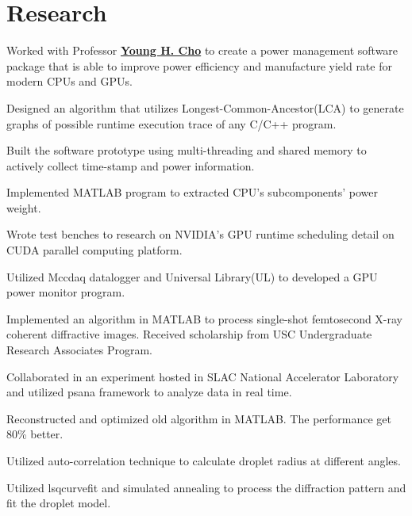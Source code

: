 \documentclass[]{deedy-resume-openfont}
\begin{document}
\begin{minipage}[t]{0.69\textwidth}

\section{Research}
Worked with Professor \textbf{\href{http://oasys.isi.edu/profile.php?id=1}{Young H. Cho}} to create a power management software package that is able to improve power efficiency and manufacture yield rate for modern CPUs and GPUs.
\begin{tightemize}
	\item Designed an algorithm that utilizes Longest-Common-Ancestor(LCA) to generate graphs of possible runtime execution trace of any C/C++ program.
	\item Built the software prototype using multi-threading and shared memory to actively collect time-stamp and power information.
	\item Implemented MATLAB program to extracted CPU's subcomponents' power weight.
	\item Wrote test benches to research on NVIDIA's GPU runtime scheduling detail on CUDA parallel computing platform.
	\item Utilized Mccdaq datalogger and Universal Library(UL) to developed a GPU power monitor program.
\end{tightemize}
\sectionsep

Implemented an algorithm in MATLAB to process single-shot femtosecond X-ray coherent diffractive images. Received scholarship from USC Undergraduate Research Associates Program.
\begin{tightemize}
	\item Collaborated in an experiment hosted in SLAC National Accelerator Laboratory and utilized psana framework to analyze data in real time.
	\item Reconstructed and optimized old algorithm in MATLAB. The performance get 80\% better.
	\item Utilized auto-correlation technique to calculate droplet radius at different angles.
	\item Utilized lsqcurvefit and simulated annealing to process the diffraction pattern and fit the droplet model.
\end{tightemize}
\sectionsep





\end{minipage} 
\end{document}
